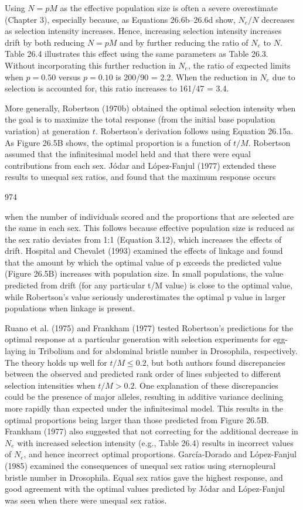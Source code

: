 \documentclass{article}
\begin{document}
{Using $N = pM$ as the effective population size is often a severe overestimate (Chapter 3), especially because, as Equations 26.6b–26.6d show, $N_e/N$ decreases as selection intensity increases. Hence, increasing selection intensity increases drift by both reducing $N = pM$ and by further reducing the ratio of $N_e$ to $N$. Table 26.4 illustrates this effect using the same parameters as Table 26.3. Without incorporating this further reduction in $N_e$, the ratio of expected limits when $p = 0.50$ versus $p = 0.10$ is 200/90 = 2.2. When the reduction in $N_e$ due to selection is accounted for, this ratio increases to 161/47 = 3.4.

More generally, Robertson (1970b) obtained the optimal selection intensity when the goal is to maximize the total response (from the initial base population variation) at generation  $ t $. Robertson’s derivation follows using Equation 26.15a. As Figure 26.5B shows, the optimal proportion is a function of  $ t/M $. Robertson assumed that the infinitesimal model held and that there were equal contributions from each sex. Jódar and López-Fanjul (1977) extended these results to unequal sex ratios, and found that the maximum response occurs

974

when the number of individuals scored and the proportions that are selected are the same in each sex. This follows because effective population size is reduced as the sex ratio deviates from 1:1 (Equation 3.12), which increases the effects of drift. Hospital and Chevalet (1993) examined the effects of linkage and found that the amount by which the optimal value of p exceeds the predicted value (Figure 26.5B) increases with population size. In small populations, the value predicted from drift (for any particular t/M value) is close to the optimal value, while Robertson's value seriously underestimates the optimal p value in larger populations when linkage is present.

Ruano et al. (1975) and Frankham (1977) tested Robertson's predictions for the optimal response at a particular generation with selection experiments for egg-laying in Tribolium and for abdominal bristle number in Drosophila, respectively. The theory holds up well for  $ t/M \leq 0.2 $, but both authors found discrepancies between the observed and predicted rank order of lines subjected to different selection intensities when  $ t/M > 0.2 $. One explanation of these discrepancies could be the presence of major alleles, resulting in additive variance declining more rapidly than expected under the infinitesimal model. This results in the optimal proportions being larger than those predicted from Figure 26.5B. Frankham (1977) also suggested that not correcting for the additional decrease in  $ N_e $ with increased selection intensity (e.g., Table 26.4) results in incorrect values of  $ N_e $, and hence incorrect optimal proportions. García-Dorado and López-Fanjul (1985) examined the consequences of unequal sex ratios using sternopleural bristle number in Drosophila. Equal sex ratios gave the highest response, and good agreement with the optimal values predicted by Jódar and López-Fanjul was seen when there were unequal sex ratios.

}
\end{document}
